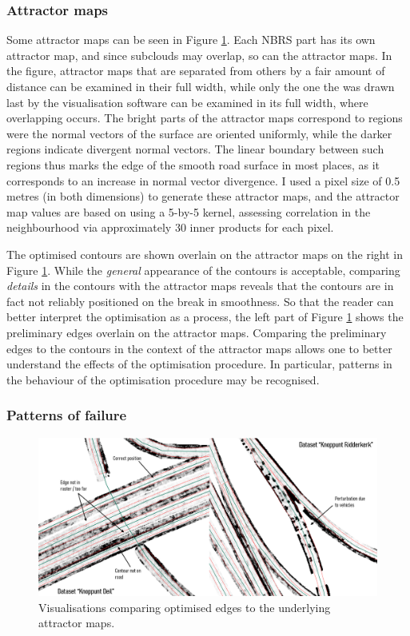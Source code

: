 \subsubsection{Attractor maps}

Some attractor maps can be seen in Figure \ref{fig:activecontouroptimisation1}. Each NBRS part has its own attractor map, and since subclouds may overlap, so can the attractor maps. In the figure, attractor maps that are separated from others by a fair amount of distance can be examined in their full width, while only the one the was drawn last by the visualisation software can be examined in its full width, where overlapping occurs. The bright parts of the attractor maps correspond to regions were the normal vectors of the surface are oriented uniformly, while the darker regions indicate divergent normal vectors. The linear boundary between such regions thus marks the edge of the smooth road surface in most places, as it corresponds to an increase in normal vector divergence. I used a pixel size of 0.5 metres (in both dimensions) to generate these attractor maps, and the attractor map values are based on using a 5-by-5 kernel, assessing correlation in the neighbourhood via approximately 30 inner products for each pixel.

The optimised contours are shown overlain on the attractor maps on the right in Figure \ref{fig:activecontouroptimisation1}. While the \textit{general} appearance of the contours is acceptable, comparing \textit{details} in the contours with the attractor maps reveals that the contours are in fact not reliably positioned on the break in smoothness. So that the reader can better interpret the optimisation as a process, the left part of Figure \ref{fig:activecontouroptimisation1} shows the preliminary edges overlain on the attractor maps. Comparing the preliminary edges to the contours in the context of the attractor maps allows one to better understand the effects of the optimisation procedure. In particular, patterns in the behaviour of the optimisation procedure may be recognised.

\subsubsection{Patterns of failure}

\begin{figure}
    \centering
    \includegraphics[width=0.9\linewidth]{final_report/figs/activecontouroptimisation1.png}
    \caption{Visualisations comparing optimised edges to the underlying attractor maps.}
    \label{fig:activecontouroptimisation1}
\end{figure}

